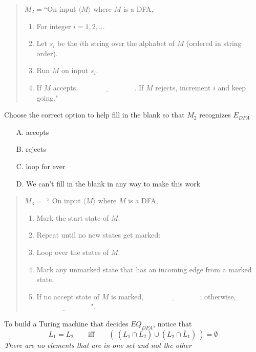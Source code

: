 \documentclass[12pt, oneside]{article}
\begin{document}
  \begin{quote}
  $M_2 =  $``On  input  $\langle M\rangle$ where $M$ is a  DFA,
  \begin{enumerate}
  \item For integer  $i = 1, 2, \ldots$
  \item \qquad Let  $s_i$ be the  $i$th string over  the alphabet of  $M$ (ordered in  string order).
  \item \qquad Run $M$ on  input  $s_i$.
  \item \qquad If $M$  accepts,  $\underline{\phantom{FILL  IN BLANK}}$.  If $M$  rejects, increment $i$ and keep going."
  \end{enumerate}
  \end{quote}
  

Choose the correct option to help fill in the blank so that $M_2$ recognizes $E_{DFA}$
\begin{itemize}
\item[A.] accepts
\item[B.] rejects
\item[C.] loop for ever
\item[D.] We can't fill in the blank in any way to make this work
\end{itemize}

\newpage
  

  
  \begin{quote}
  $M_3 =  $ `` On  input $\langle M \rangle$ where $M$ is  a  DFA,
  \begin{enumerate}
  \item Mark the start  state  of $M$.
  \item Repeat until no  new states get marked:
  \item \qquad Loop over the states of $M$. 
  \item \qquad Mark any unmarked  state  that  has an incoming  edge  from a marked state.
  \item If  no  accept state of $M$ is  marked, $\underline{\phantom{FILL  IN BLANK}}$;  otherwise, 
  $\underline{\phantom{FILL  IN BLANK}}$".
  \end{enumerate}
  \end{quote}
  
  
  
To build a Turing machine that decides $EQ_{DFA}$, notice that 
\[
L_1 = L_2 \qquad\textrm{iff}\qquad (~(L_1 \cap \overline{L_2}) \cup (L_2 \cap \overline L_1)~) = \emptyset  
\]
{\it There are no elements that are in one set and not the other}
\end{document}
